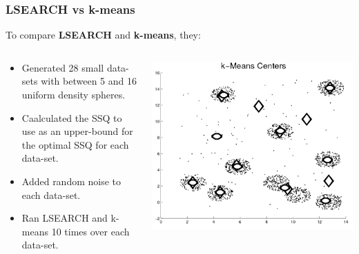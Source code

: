 \documentclass{beamer}
\begin{document}
\frame
{
  \frametitle{LSEARCH vs k-means}
  
  To compare \textbf{LSEARCH} and \textbf{k-means}, they:
  
  \begin{columns}
  
    \begin{column}{0.5\textwidth}
       \begin{itemize}
          \item{Generated 28 small data-sets with between 5 and 16 uniform density spheres.}
          \item{Caalculated the SSQ to use as an upper-bound for the optimal SSQ for each data-set.}
          \item{Added random noise to each data-set.}
          \item{Ran LSEARCH and k-means 10 times over each data-set.}
      \end{itemize}
    \end{column}
    
    \begin{column}{0.5\textwidth}
        \begin{center}
         \includegraphics[width=\textwidth]{figures/k-means_clusters.png}      
        \end{center}
    \end{column}
    
  \end{columns}  
}
\end{document}

